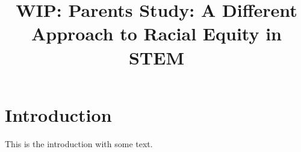 \documentclass{article}
\begin{document}
\title{WIP: Parents Study:  A Different Approach to Racial Equity in STEM}

\section{Introduction}

This is the introduction with some text.
\end{document}

